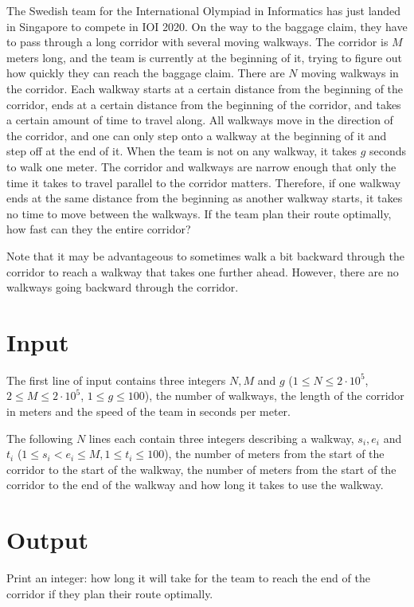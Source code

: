 \noindent
The Swedish team for the International Olympiad in Informatics has just landed in Singapore to compete in IOI 2020.
On the way to the baggage claim, they have to pass through a long corridor with several moving walkways.
The corridor is $M$ meters long, and the team is currently at the beginning of it, trying to figure out how quickly
they can reach the baggage claim. There are $N$ moving walkways in the corridor. Each walkway starts at a certain
distance from the beginning of the corridor, ends at a certain distance from the beginning of the corridor, and
takes a certain amount of time to travel along. All walkways move in the direction of the corridor, and one can
only step onto a walkway at the beginning of it and step off at the end of it. When the team is not on any walkway,
it takes $g$ seconds to walk one meter. The corridor and walkways are narrow enough that only the time it takes to
travel parallel to the corridor matters. Therefore, if one walkway ends at the same distance from the beginning as
another walkway starts, it takes no time to move between the walkways. If the team plan their route optimally, how
fast can they the entire corridor?

Note that it may be advantageous to sometimes walk a bit backward through the
corridor to reach a walkway that takes one further ahead. However, there are no walkways going backward through the corridor.

\section*{Input}
The first line of input contains three integers $N, M$ and $g$ ($1 \le N \le 2 \cdot 10^5$, $2 \le M \le 2 \cdot 10^5$, $1 \le g \le 100$),
the number of walkways, the length of the corridor in meters and the speed of the team in seconds per meter.

The following $N$ lines each contain three integers describing a walkway, $s_i, e_i$ and $t_i$ 
($1\leq s_i < e_i\leq M,1\leq t_i\leq100$), the number of meters from the start of the corridor to the start of the walkway,
the number of meters from the start of the corridor to the end of the walkway and how long it takes to use the walkway.

\section*{Output}
Print an integer: how long it will take for the team to reach the end of the corridor if they plan their route optimally.

